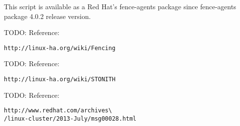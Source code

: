 This script is available as a Red Hat's fence-agents package since fence-agents package 4.0.2 release version.


TODO: Reference: 
\begin{verbatim}
http://linux-ha.org/wiki/Fencing
\end{verbatim}

TODO: Reference:
\begin{verbatim}
http://linux-ha.org/wiki/STONITH
\end{verbatim}

TODO: Reference:
\begin{verbatim}
http://www.redhat.com/archives\
/linux-cluster/2013-July/msg00028.html
\end{verbatim}

